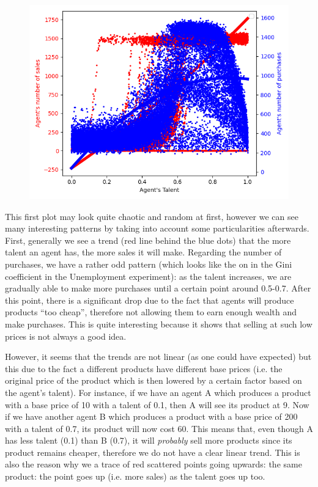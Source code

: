 {{{{{{{{{{{        \begin{figure}
            \includegraphics[width=\linewidth]{img/exp/11.png}
        \end{figure} 
        { This first plot may look quite chaotic and random at first, however we can see many interesting patterns by taking into account some particularities afterwards. First, generally we see a trend (red line behind the blue dots) that the more talent an agent has, the more sales it will make. Regarding the number of purchases, we have a rather odd pattern (which looks like the on in the Gini coefficient in the Unemployment experiment): as the talent increases, we are gradually able to make more purchases until a certain point around 0.5-0.7. After this point, there is a significant drop due to the fact that agents will produce products ``too cheap'', therefore not allowing them to earn enough wealth and make purchases. This is quite interesting because it shows that selling at such low prices is not always a good idea.
        
        However, it seems that the trends are not linear (as one could have expected) but this due to the fact a different products have different base prices (i.e. the original price of the product which is then lowered by a certain factor based on the agent's talent). For instance, if we have an agent A which produces a product with a base price of 10 with a talent of 0.1, then A will see its product at 9. Now if we have another agent B which produces a product with a base price of 200 with a talent of 0.7, its product will now cost 60. This means that, even though A has less talent (0.1) than B (0.7), it will \emph{probably} sell more products since its product remains cheaper, therefore we do not have a clear linear trend.
        This is also the reason why we a trace of red scattered points going upwards: the same product: the point goes up (i.e. more sales) as the talent goes up too.

}}}}}}}}}}}}
